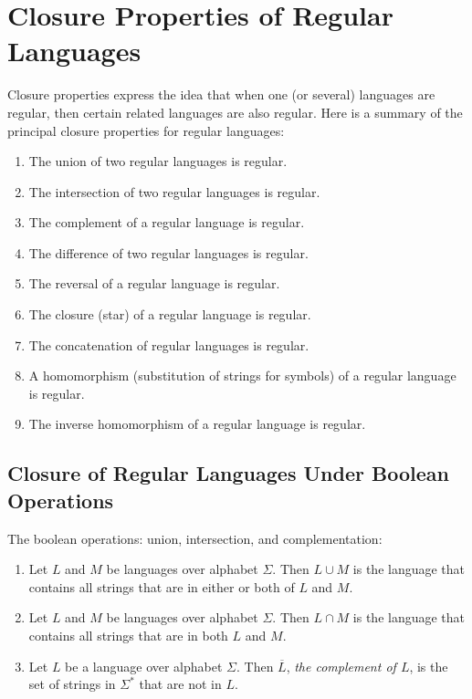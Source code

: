 \documentclass[]{article}
\begin{document}
\section*{Closure Properties of Regular Languages}
  Closure properties express the idea that when one (or several) languages are
  regular, then certain related languages are also regular. Here is a summary of
  the principal closure properties for regular languages:
    \begin{enumerate}
      \item The union of two regular languages is regular.
      \item The intersection of two regular languages is regular.
      \item The complement of a regular language is regular.
      \item The difference of two regular languages is regular.
      \item The reversal of a regular language is regular.
      \item The closure (star) of a regular language is regular.
      \item The concatenation of regular languages is regular.
      \item A homomorphism (substitution of strings for symbols) of a regular
      language is regular.
      \item The inverse homomorphism of a regular language is regular.
    \end{enumerate}

  \subsection*{Closure of Regular Languages Under Boolean Operations}
    The boolean operations: union, intersection, and complementation:
      \begin{enumerate}
        \item Let $L$ and $M$ be languages over alphabet $\Sigma$. Then
        $L \cup M$ is the language that contains all strings that are in either
        or both of $L$ and $M$.
        \item Let $L$ and $M$ be languages over alphabet $\Sigma$. Then
        $L \cap M$ is the language that contains all strings that are in both
        $L$ and $M$.
        \item Let $L$ be a language over alphabet $\Sigma$. Then $\overline{L}$,
        \emph{the complement of $L$}, is the set of strings in $\Sigma^*$ that
        are not in $L$.
      \end{enumerate}
\end{document}
